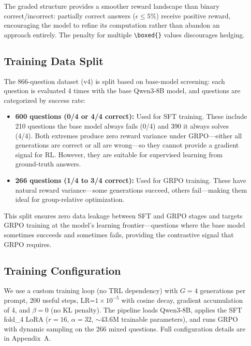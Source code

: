 The graded structure provides a smoother reward landscape than binary correct/incorrect: partially correct answers ($\epsilon \leq 5\%$) receive positive reward, encouraging the model to refine its computation rather than abandon an approach entirely. The penalty for multiple \verb|\boxed{}| values discourages hedging.

\subsection{Training Data Split}
\label{sec:grpo:split}

The 866-question dataset (v4) is split based on base-model screening: each question is evaluated 4 times with the base Qwen3-8B model, and questions are categorized by success rate:

\begin{itemize}
    \item \textbf{600 questions (0/4 or 4/4 correct):} Used for SFT training. These include 210 questions the base model always fails (0/4) and 390 it always solves (4/4). Both extremes produce zero reward variance under GRPO---either all generations are correct or all are wrong---so they cannot provide a gradient signal for RL. However, they are suitable for supervised learning from ground-truth answers.
    \item \textbf{266 questions (1/4 to 3/4 correct):} Used for GRPO training. These have natural reward variance---some generations succeed, others fail---making them ideal for group-relative optimization.
\end{itemize}

This split ensures zero data leakage between SFT and GRPO stages and targets GRPO training at the model's learning frontier---questions where the base model sometimes succeeds and sometimes fails, providing the contrastive signal that GRPO requires.

\subsection{Training Configuration}
\label{sec:grpo:config}

We use a custom training loop (no TRL dependency) with $G\!=\!4$ generations per prompt, 200 useful steps, LR=$1\!\times\!10^{-5}$ with cosine decay, gradient accumulation of 4, and $\beta\!=\!0$ (no KL penalty). The pipeline loads Qwen3-8B, applies the SFT fold\_4 LoRA ($r\!=\!16$, $\alpha\!=\!32$, $\sim$43.6M trainable parameters), and runs GRPO with dynamic sampling on the 266 mixed questions. Full configuration details are in Appendix~A.

